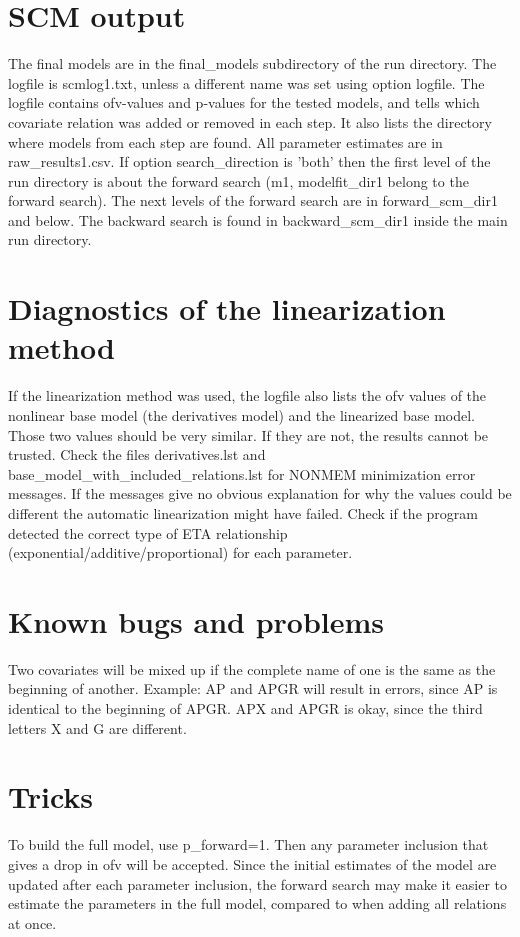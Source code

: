 \documentclass[a4paper,12pt]{article}
\begin{document}
\section{SCM output}
The final models are in the final\_models subdirectory of the run directory. The logfile is scmlog1.txt, unless a different name was set using option logfile. The logfile contains ofv-values and p-values for the tested models, and tells which covariate relation was added or removed in each step. It also lists the directory where models from each step are found. All parameter estimates are in raw\_results1.csv. If option search\_direction is 'both' then the first level of the run directory is about the forward search (m1, modelfit\_dir1 belong to the forward search). The next levels of the forward search are in forward\_scm\_dir1 and below. The backward search is found in backward\_scm\_dir1 inside the main run directory.  


\section{Diagnostics of the linearization method}
If the linearization method was used, the logfile also lists the ofv values of the nonlinear base model (the derivatives model) and the linearized base model. Those two values should be very similar. If they are not, the results cannot be trusted. Check the files derivatives.lst and base\_model\_with\_included\_relations.lst for NONMEM minimization error messages. If the messages give no obvious explanation for why the values could be different the automatic linearization might have failed. Check if the program detected the correct type of ETA relationship (exponential/additive/proportional) for each parameter. 

\section{Known bugs and problems}
Two covariates will be mixed up if the complete name of one is the same as the beginning of another. Example: AP and APGR will result in errors, since AP is identical to the beginning of APGR. APX and APGR is okay, since the third letters X and G are different. 

\section{Tricks}
To build the full model, use p\_forward=1. Then any parameter inclusion that gives a drop in ofv will be accepted. Since the initial estimates of the model are updated after each parameter inclusion, the forward search may make it easier to estimate the parameters in the full model, compared to when adding all relations at once.
\end{document}
